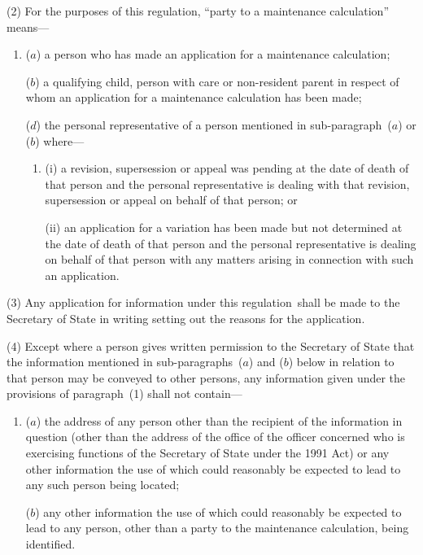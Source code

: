 \documentclass[12pt,a4paper]{article}
\begin{document}
(2) For the purposes of this regulation, “party to a maintenance calculation” means—
\begin{enumerate}\item[]
($a$) a person who has made an application for a maintenance calculation;

($b$) a qualifying child, person with care or non-resident parent in respect of whom an application for a maintenance calculation has been made;


($d$) the personal representative of a person mentioned in sub-\hspace{0pt}paragraph~($a$)  or ($b$)  where—
\begin{enumerate}\item[]
(i) a revision, supersession or appeal was pending at the date of death of that person and the personal representative is dealing with that revision, supersession or appeal on behalf of that person; or

(ii) an application for a variation has been made but not determined at the date of death of that person and the personal representative is dealing on behalf of that person with any matters arising in connection with such an application.
\end{enumerate}
\end{enumerate}

(3) Any application for information under this regulation~shall be made to the 
Secretary of State  %
in writing setting out the reasons for the application.

(4) Except where a person gives written permission to the 
Secretary of State  %
that the information mentioned in sub-paragraphs~($a$)  and ($b$)  below in relation to that person may be conveyed to other persons, any information given under the provisions of paragraph~(1) shall not contain—
\begin{enumerate}\item[]
($a$) the address of any person other than the recipient of the information in question (other than the address of the office of the officer concerned who is exercising functions of the 
Secretary of State  %
under the 1991 Act) or any other information the use of which could reasonably be expected to lead to any such person being located;

($b$) any other information the use of which could reasonably be expected to lead to any person, other than a party to the maintenance calculation, being identified.
\end{enumerate}
\end{document}
